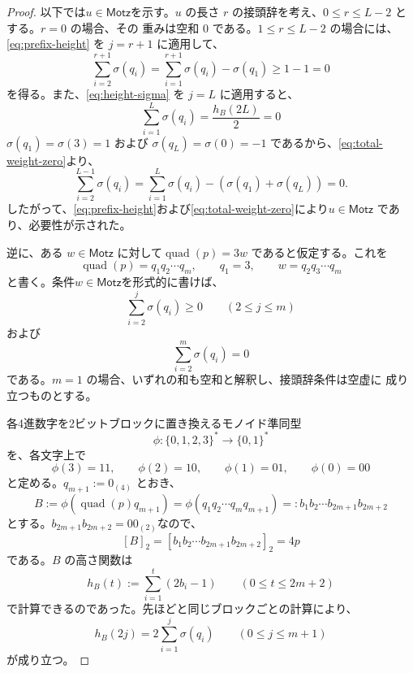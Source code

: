 \documentclass[12pt]{ltjsarticle}
\theoremstyle{plain}
\theoremstyle{definition}
\theoremstyle{plain}
\begin{document}
\begin{proof}
以下では$u\in\mathsf{Motz}$を示す。$u$ の長さ $r$ の接頭辞を考え、$0\leq r\leq L-2$ とする。$r=0$ の場合、その
重みは空和 $0$ である。$1\leq r\leq L-2$ の場合には、
\eqref{eq:prefix-height} を $j=r+1$ に適用して、
\begin{equation}\label{eq:motzkin-prefix-nonnegative}
 \sum_{i=2}^{r+1}\sigma(q_i)
 =\sum_{i=1}^{r+1}\sigma(q_i)-\sigma(q_1)
 \geq1-1=0
\end{equation}
を得る。また、\eqref{eq:height-sigma} を $j=L$ に適用すると、
\begin{equation}\label{eq:total-weight-zero}
 \sum_{i=1}^{L}\sigma(q_i)
 =\frac{h_B(2L)}{2}
 =0
\end{equation}
$\sigma(q_1)=\sigma(3)=1$ および $\sigma(q_L)=\sigma(0)=-1$ であるから、\eqref{eq:total-weight-zero}より、
\[
 \sum_{i=2}^{L-1}\sigma(q_i)= \sum_{i=1}^{L}\sigma(q_i)-(\sigma(q_1)+\sigma(q_L))=0.
\]
したがって、\eqref{eq:prefix-height}および\eqref{eq:total-weight-zero}により$u\in\mathsf{Motz}$ であり、必要性が示された。

逆に、ある $w\in\mathsf{Motz}$ に対して$ \operatorname{quad}(p)=3w$
であると仮定する。これを
\[
 \operatorname{quad}(p)=q_1q_2\cdots q_m,
 \qquad
 q_1=3,
 \qquad
 w=q_2q_3\cdots q_m
\]
と書く。条件$w\in\mathsf{Motz}$を形式的に書けば、
\begin{equation}\label{eq:reverse-motzkin-prefix}
 \sum_{i=2}^{j}\sigma(q_i)\geq0
 \qquad(2\leq j\leq m)
\end{equation}
および
\begin{equation}\label{eq:reverse-motzkin-total}
 \sum_{i=2}^{m}\sigma(q_i)=0
\end{equation}
である。$m=1$ の場合、いずれの和も空和と解釈し、接頭辞条件は空虚に
成り立つものとする。

各4進数字を2ビットブロックに置き換えるモノイド準同型
\[
 \phi:\{0,1,2,3\}^*\longrightarrow\{0,1\}^*
\]
を、各文字上で
\[
 \phi(3)=11,\qquad
 \phi(2)=10,\qquad
 \phi(1)=01,\qquad
 \phi(0)=00
\]
と定める。$q_{m+1}:=0_{(4)}$ とおき、
\[
 B:=\phi( \operatorname{quad}(p)q_{m+1})=\phi(q_1q_2\cdots q_mq_{m+1})
   =:b_1b_2\cdots  b_{2m+1}b_{2m+2}
\]
とする。$b_{2m+1}b_{2m+2}=00_{(2)}$なので、
\begin{equation}\label{eq:block-value}
 [B]_2=[b_1b_2\cdots  b_{2m+1}b_{2m+2}]_2=4p
\end{equation}
である。$B$ の高さ関数は
\[
 h_B(t):=\sum_{i=1}^{t}(2b_i-1)
 \qquad(0\leq t\leq2m+2)
\]
で計算できるのであった。先ほどと同じブロックごとの計算により、
\begin{equation}\label{eq:reverse-height-sigma}
 h_B(2j)=2\sum_{i=1}^{j}\sigma(q_i)
 \qquad(0\leq j\leq m+1)
\end{equation}
が成り立つ。


\end{proof}
\end{document}
